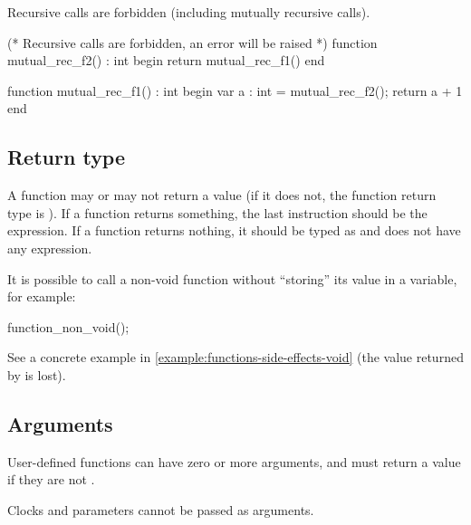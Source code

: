 Recursive calls are forbidden (including mutually recursive calls).


\begin{IMITATORmodel}
(* Recursive calls are forbidden, an error will be raised *)
function mutual_rec_f2() : int
begin
	return mutual_rec_f1()
end

function mutual_rec_f1() : int
begin
	var a : int = mutual_rec_f2();
	return a + 1
end
\end{IMITATORmodel}




\subsection{Return type}

A function may or may not return a value (if it does not, the function return type is ).
If a function returns something, the last instruction should be the  expression.
If a function returns nothing, it should be typed as  and does not have any  expression.

It is possible to call a non-void function without ``storing'' its value in a variable, for example:

\begin{IMITATORmodel}
function_non_void();
\end{IMITATORmodel}

See a concrete example in \cref{example:functions-side-effects-void} (the value returned by  is lost).


\subsection{Arguments}

User-defined functions can have zero or more arguments, and must return a value if they are not .

Clocks and parameters cannot be passed as arguments.


